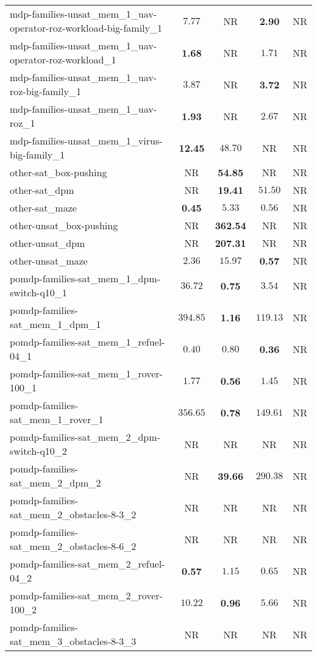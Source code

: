 \begin{tabular}{lcccc}
mdp-families-unsat\_mem\_1\_uav-operator-roz-workload-big-family\_1 & $7.77$ & NR & \textbf{2.90} & NR \\
mdp-families-unsat\_mem\_1\_uav-operator-roz-workload\_1 & \textbf{1.68} & NR & $1.71$ & NR \\
mdp-families-unsat\_mem\_1\_uav-roz-big-family\_1 & $3.87$ & NR & \textbf{3.72} & NR \\
mdp-families-unsat\_mem\_1\_uav-roz\_1 & \textbf{1.93} & NR & $2.67$ & NR \\
mdp-families-unsat\_mem\_1\_virus-big-family\_1 & \textbf{12.45} & $48.70$ & NR & NR \\
other-sat\_box-pushing & NR & \textbf{54.85} & NR & NR \\
other-sat\_dpm & NR & \textbf{19.41} & $51.50$ & NR \\
other-sat\_maze & \textbf{0.45} & $5.33$ & $0.56$ & NR \\
other-unsat\_box-pushing & NR & \textbf{362.54} & NR & NR \\
other-unsat\_dpm & NR & \textbf{207.31} & NR & NR \\
other-unsat\_maze & $2.36$ & $15.97$ & \textbf{0.57} & NR \\
pomdp-families-sat\_mem\_1\_dpm-switch-q10\_1 & $36.72$ & \textbf{0.75} & $3.54$ & NR \\
pomdp-families-sat\_mem\_1\_dpm\_1 & $394.85$ & \textbf{1.16} & $119.13$ & NR \\
pomdp-families-sat\_mem\_1\_refuel-04\_1 & $0.40$ & $0.80$ & \textbf{0.36} & NR \\
pomdp-families-sat\_mem\_1\_rover-100\_1 & $1.77$ & \textbf{0.56} & $1.45$ & NR \\
pomdp-families-sat\_mem\_1\_rover\_1 & $356.65$ & \textbf{0.78} & $149.61$ & NR \\
pomdp-families-sat\_mem\_2\_dpm-switch-q10\_2 & NR & NR & NR & NR \\
pomdp-families-sat\_mem\_2\_dpm\_2 & NR & \textbf{39.66} & $290.38$ & NR \\
pomdp-families-sat\_mem\_2\_obstacles-8-3\_2 & NR & NR & NR & NR \\
pomdp-families-sat\_mem\_2\_obstacles-8-6\_2 & NR & NR & NR & NR \\
pomdp-families-sat\_mem\_2\_refuel-04\_2 & \textbf{0.57} & $1.15$ & $0.65$ & NR \\
pomdp-families-sat\_mem\_2\_rover-100\_2 & $10.22$ & \textbf{0.96} & $5.66$ & NR \\
pomdp-families-sat\_mem\_3\_obstacles-8-3\_3 & NR & NR & NR & NR \\

\end{tabular}
